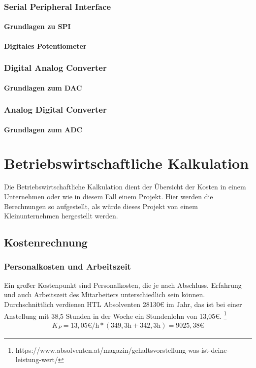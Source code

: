 \documentclass[paper=a4, 12pt]{scrreprt}
\begin{document}
		\subsection{Serial Peripheral Interface}\hfill \break
			\subsubsection{Grundlagen zu SPI}\hfill \break
			\subsubsection{Digitales Potentiometer}\hfill \break
			\newpage
		\subsection{Digital Analog Converter}\hfill \break
			\subsubsection{Grundlagen zum DAC}\hfill \break
			\newpage
		\subsection{Analog Digital Converter}\hfill \break
			\subsubsection{Grundlagen zum ADC}\hfill \break
			\newpage
{}	
\chapter{Betriebswirtschaftliche Kalkulation}\hfill \break
Die Betriebswirtschaftliche Kalkulation dient der Übersicht der Kosten in einem Unternehmen oder wie in diesem Fall einem Projekt. Hier werden die Berechnungen so aufgestellt, als würde dieses Projekt von einem Kleinunternehmen hergestellt werden. 
	\section{Kostenrechnung}\hfill \break
		\subsection{Personalkosten und Arbeitszeit}\hfill \break
		Ein großer Kostenpunkt sind Personalkosten, die je nach Abschluss, Erfahrung und auch Arbeitszeit des Mitarbeiters unterschiedlich sein können.
		Durchschnittlich verdienen HTL Absolventen 28130€ im Jahr, das ist bei einer Anstellung mit 38,5 Stunden in der Woche ein Stundenlohn von 13,05€. \footnote{https://www.absolventen.at/magazin/gehaltsvorstellung-was-ist-deine-leistung-wert/}
		\begin{align*} 
		K_{ P } = 13,05\text{€/h} * (349,3\text{h} + 342,3\text{h}) = 9025,38\text{€}
		\end{align*} 
\end{document}
